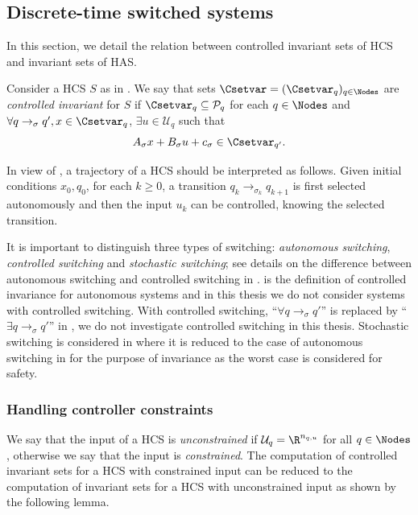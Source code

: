 \documentclass[11pt,twoside,a4paper,openright]{uclouvain-thesis}
\newcommand{\tr}{\to}
\newcommand{\trs}[1][\sigma]{\tr_{#1}}
\newcommand{\nqu}{n_{q,u}}
\newcommand{\Ps}{\mathcal{P}}
\newcommand{\U}{\mathcal{U}}
\newcommand{\sys}{S}
\newcommand{\dtahcs}{HCS}
\newcommand{\dtahas}{HAS}
\begin{document}
\subsection{Discrete-time switched systems}
\label{sec:controlled_to_algebraic}
In this section, we detail the relation between controlled invariant sets of \dtahcs{} and invariant sets of \dtahas{}.

\begin{mydef}[Controlled invariant sets for a \dtahcs{}]
  \label{def:cis}
  Consider a \dtahcs{} $\sys$ as in .
  We say that sets $\Csetvar = (\Csetvar_q)_{q \in \Nodes}$ are \emph{controlled invariant} for $\sys$ if
  $\Csetvar_q \subseteq \Ps_q$ for each $q \in \Nodes$ and
  $\forall q \trs[\sigma] q', x \in \Csetvar_q$, $\exists u \in \U_q$ such that
  \[ A_\sigma x + B_\sigma u + c_\sigma \in \Csetvar_{q'}. \]
\end{mydef}

In view of , a trajectory of a \dtahcs{} should be interpreted as follows.
Given initial conditions $x_0, q_0$, for each $k \ge 0$, a transition $q_k \trs[\sigma_{k}] q_{k+1}$
is first selected autonomously and then the input $u_k$ can be controlled, knowing the selected
transition.

\begin{myrem}
  \label{rem:autonomous}
  It is important to distinguish three types of switching:
  \emph{autonomous switching}, \emph{controlled switching} and \emph{stochastic switching};
  see details on the difference between autonomous switching and controlled switching in \cite[Section~1.1.3]{liberzon2012switching}.
   is the definition of controlled invariance for autonomous systems and in this thesis we do not consider systems with controlled switching.
  With controlled switching, ``$\forall q \trs[\sigma] q'$'' is replaced by ``$\exists q \trs[\sigma] q'$'' in , we do not investigate controlled switching in this thesis.
  Stochastic switching is considered in  where it is reduced
  to the case of autonomous switching in  for the purpose of invariance
  as the worst case is considered for safety.
\end{myrem}

\subsubsection{Handling controller constraints}
\label{sec:constraints}
We say that the input of a \dtahcs{} is \emph{unconstrained} if $\U_q = \R^{\nqu}$ for all $q \in \Nodes$, otherwise we say that the input is \emph{constrained}.
The computation of controlled invariant sets for a \dtahcs{} with constrained input can be reduced to the computation of invariant sets for a \dtahcs{} with unconstrained input
as shown by the following lemma.
\end{document}
